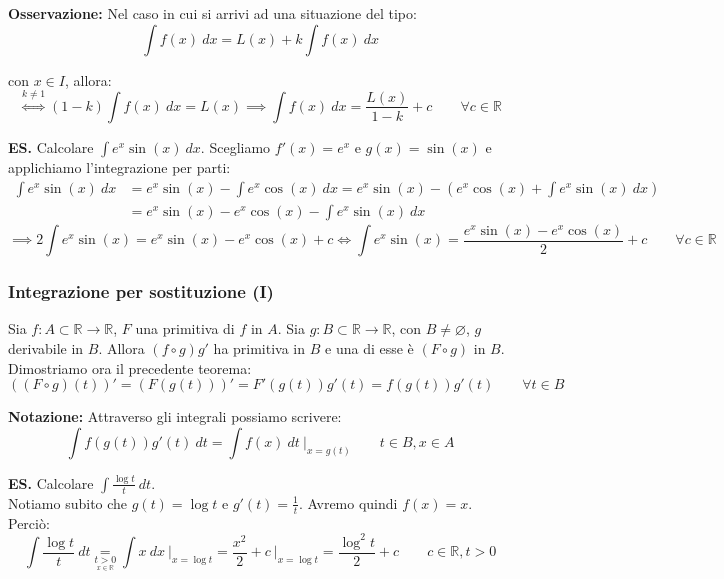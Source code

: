 \documentclass{article}
\begin{document}
\noindent\textbf{Osservazione:} Nel caso in cui si arrivi ad una situazione del tipo:
\begin{equation*}
    \int f(x) \ dx = L(x) + k \int f(x) \ dx
\end{equation*}

\noindent con $x \in I$, allora:
\begin{equation*}
    \overset{k \neq 1}{\iff} (1 - k) \int f(x) \ dx = L(x)  \implies \int f(x) \ dx = \frac{L(x)}{1 - k} + c \qquad \forall c \in \mathbb{R}
\end{equation*}

\noindent\textbf{ES.} Calcolare $\int e^x\sin(x) \ dx$.
Scegliamo $f'(x) = e^x$ e $g(x) = \sin(x)$ e applichiamo l'integrazione per parti:
\begin{align*}
    \int e^x\sin(x) \ dx &= e^x\sin(x) - \int e^x\cos(x) \ dx = e^x \sin(x) - \left(e^x\cos(x) + \int e^x\sin(x) \ dx\right) \\
    &= e^x\sin(x) - e^x\cos(x) - \int e^x\sin(x) \ dx
\end{align*}
\begin{equation*}
    \implies 2 \int e^x\sin(x) = e^x\sin(x) - e^x\cos(x) + c\iff \int e^x\sin(x) = \frac{e^x\sin(x) - e^x\cos(x)}{2} + c \qquad \forall c \in \mathbb{R}
\end{equation*}

\subsubsection{Integrazione per sostituzione (I)}
Sia $f: A \subset \mathbb{R} \xrightarrow{} \mathbb{R}$, $F$ una primitiva di $f$ in $A$. Sia $g: B \subset \mathbb{R} \xrightarrow{} \mathbb{R}$, con $B \neq \varnothing$, $g$ derivabile in $B$. Allora $(f \circ g)g'$ ha primitiva in $B$ e una di esse è $(F \circ g)$ in $B$.\\

\noindent Dimostriamo ora il precedente teorema:
\begin{equation*}
    ((F \circ g)(t))' = (F(g(t)))' = F'(g(t))g'(t) = f(g(t))g'(t) \qquad \forall t \in B
\end{equation*}

\noindent\textbf{Notazione:} Attraverso gli integrali possiamo scrivere:
\begin{equation*}
    \int f(g(t))g'(t) \ dt = \int f(x) \ dt \ \bigg|_{x = g(t)} \qquad t \in B, x \in A
\end{equation*}

\noindent\textbf{ES.} Calcolare $\int \frac{\log t}{t} \ dt$.\\
Notiamo subito che $g(t) = \log t$ e $g'(t) = \frac{1}{t}$. Avremo quindi $f(x) = x$. Perciò:
\begin{equation*}
    \int \frac{\log t}{t} \ dt \underset{\underset{\scriptstyle x \in \mathbb{R}}{t > 0}}{=} \int x \ dx \ \bigg|_{x = \log t} = \frac{x^2}{2} + c \ \bigg|_{x = \log t} = \frac{\log^2t}{2} + c \qquad c \in \mathbb{R}, t > 0
\end{equation*}
\end{document}
